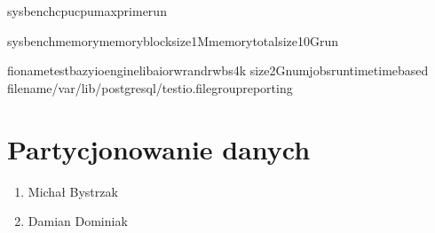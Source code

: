 \documentclass[a4paper,11pt,english,openany,oneside]{sphinxmanual}
\begin{document}
\begin{sphinxVerbatim}[commandchars=\\\{\}]
sysbenchcpu\PYGZhy{}\PYGZhy{}cpu\PYGZhy{}max\PYGZhy{}primerun

sysbenchmemory\PYGZhy{}\PYGZhy{}memory\PYGZhy{}block\PYGZhy{}size1M\PYGZhy{}\PYGZhy{}memory\PYGZhy{}total\PYGZhy{}size10Grun

fio\PYGZhy{}\PYGZhy{}nametest\PYGZus{}bazy\PYGZhy{}\PYGZhy{}ioenginelibaio\PYGZhy{}\PYGZhy{}rwrandrw\PYGZhy{}\PYGZhy{}bs4k
\PYGZhy{}\PYGZhy{}size2G\PYGZhy{}\PYGZhy{}numjobs\PYGZhy{}\PYGZhy{}runtime\PYGZhy{}\PYGZhy{}time\PYGZus{}based
\PYGZhy{}\PYGZhy{}filename/var/lib/postgresql/test\PYGZus{}io.file\PYGZhy{}\PYGZhy{}group\PYGZus{}reporting
\end{sphinxVerbatim}

\sphinxstepscope


\section{Partycjonowanie danych}
\label{\detokenize{rozdzial_2/rozdzial_26/index:partycjonowanie-danych}}\label{\detokenize{rozdzial_2/rozdzial_26/index::doc}}
\sphinxAtStartPar
{}
\begin{enumerate}
%
\item {} 
\sphinxAtStartPar
Michał Bystrzak

\item {} 
\sphinxAtStartPar
Damian Dominiak

\end{enumerate}
\end{document}
